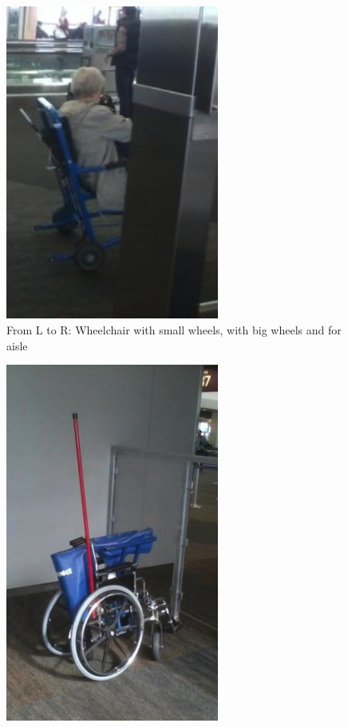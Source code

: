\documentclass[a4paper, 12pt,conference]{new_cit_thesis}
\begin{document}
\begin{list}{-}{}
\begin{figure}[h]
  \centering
     \includegraphics[width=7cm]{images/image034}
   \caption{From L to R: Wheelchair with small wheels, with big wheels and for aisle}
  \label{fig:34}
\end{figure}
\begin{figure}[h]
  \centering
     \includegraphics[width=7cm]{images/image035}
  \label{fig:35}
\end{figure}
\begin{figure}[h]
  \centering

\end{figure}
\end{list}
\end{document}
